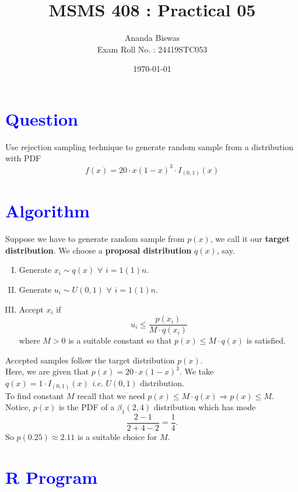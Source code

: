 \documentclass[11pt, a4paper]{article}\usepackage[]{graphicx}\usepackage[]{xcolor}
\title{MSMS 408 : Practical 05}
\author{Ananda Biswas \\[1em] Exam Roll No. : 24419STC053}
\date{\today}
\begin{document}
\maketitle


\section*{\faArrowAltCircleRight[regular] \textcolor{blue}{Question}}

\hspace{1cm} Use rejection sampling technique to generate random sample from a distribution with PDF
\begin{equation*}
f(x) = 20 \cdot x (1-x)^3 \cdot I_{(0, 1)}(x)
\end{equation*}

\section*{\faArrowAltCircleRight[regular] \textcolor{blue}{Algorithm}}

Suppose we have to generate random sample from $p(x)$, we call it our \textbf{target distribution}. We choose a \textbf{proposal distribution} $q(x)$, say.

\begin{enumerate}[I.]
\item Generate $x_i \sim q(x)$ $\forall$ $i = 1(1)n$.
\item Generate $u_i \sim U(0, 1)$ $\forall$ $i = 1(1)n$.
\item Accept $x_i$ if $$u_i \leq \dfrac{p(x_i)}{M \cdot q(x_i)}$$ where $M > 0$ is a suitable constant so that $p(x) \leq M \cdot q(x)$ is satisfied.
\end{enumerate}

Accepted samples follow the target distribution $p(x)$. \\[0.2em]

Here, we are given that $p(x) = 20 \cdot x (1-x)^3$. We take $q(x) = 1 \cdot I_{(0, 1)}(x)$ \textit{i.e.} $U(0, 1)$ distribution. \\[0.2em]

To find constant $M$ recall that we need $p(x) \leq M \cdot q(x) \Rightarrow p(x) \leq M$. Notice, $p(x)$ is the PDF of a $\beta_1(2, 4)$ distribution which has mode $$\dfrac{2-1}{2+4-2} = \dfrac{1}{4}.$$ So $p(0.25) \approx 2.11$ is a suitable choice for $M$.

\newpage

\section*{\faArrowAltCircleRight[regular] \textcolor{blue}{R Program}}
\end{document}

